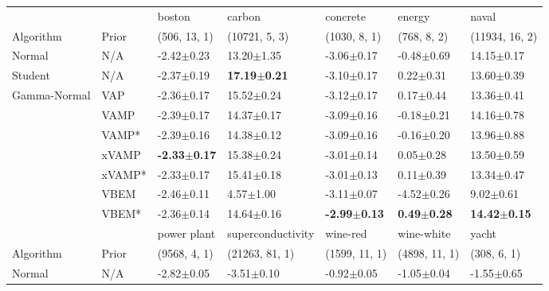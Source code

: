 \begin{tabular}{lllllll}
\toprule
             &       &                   boston &                   carbon &                 concrete &                  energy &                    naval \\
Algorithm & Prior& (506, 13, 1)& (10721, 5, 3)& (1030, 8, 1)& (768, 8, 2)& (11934, 16, 2)\\
\midrule
Normal & N/A &           -2.42$\pm$0.23 &           13.20$\pm$1.35 &           -3.06$\pm$0.17 &          -0.48$\pm$0.69 &           14.15$\pm$0.17 \\
Student & N/A &           -2.37$\pm$0.19 &  \textbf{17.19$\pm$0.21} &           -3.10$\pm$0.17 &           0.22$\pm$0.31 &           13.60$\pm$0.39 \\
Gamma-Normal & VAP &           -2.36$\pm$0.17 &           15.52$\pm$0.24 &           -3.12$\pm$0.17 &           0.17$\pm$0.44 &           13.36$\pm$0.41 \\
             & VAMP &           -2.39$\pm$0.17 &           14.37$\pm$0.17 &           -3.09$\pm$0.16 &          -0.18$\pm$0.21 &           14.16$\pm$0.78 \\
             & VAMP* &           -2.39$\pm$0.16 &           14.38$\pm$0.12 &           -3.09$\pm$0.16 &          -0.16$\pm$0.20 &           13.96$\pm$0.88 \\
             & xVAMP &  \textbf{-2.33$\pm$0.17} &           15.38$\pm$0.24 &           -3.01$\pm$0.14 &           0.05$\pm$0.28 &           13.50$\pm$0.59 \\
             & xVAMP* &           -2.33$\pm$0.17 &           15.41$\pm$0.18 &           -3.01$\pm$0.13 &           0.11$\pm$0.39 &           13.34$\pm$0.47 \\
             & VBEM &           -2.46$\pm$0.11 &            4.57$\pm$1.00 &           -3.11$\pm$0.07 &          -4.52$\pm$0.26 &            9.02$\pm$0.61 \\
             & VBEM* &           -2.36$\pm$0.14 &           14.64$\pm$0.16 &  \textbf{-2.99$\pm$0.13} &  \textbf{0.49$\pm$0.28} &  \textbf{14.42$\pm$0.15} \\
\midrule
             &       &              power plant &        superconductivity &                 wine-red &               wine-white &                    yacht \\
Algorithm & Prior& (9568, 4, 1)& (21263, 81, 1)& (1599, 11, 1)& (4898, 11, 1)& (308, 6, 1)\\
\midrule
Normal & N/A &           -2.82$\pm$0.05 &           -3.51$\pm$0.10 &           -0.92$\pm$0.05 &           -1.05$\pm$0.04 &           -1.55$\pm$0.65 \\

\end{tabular}
